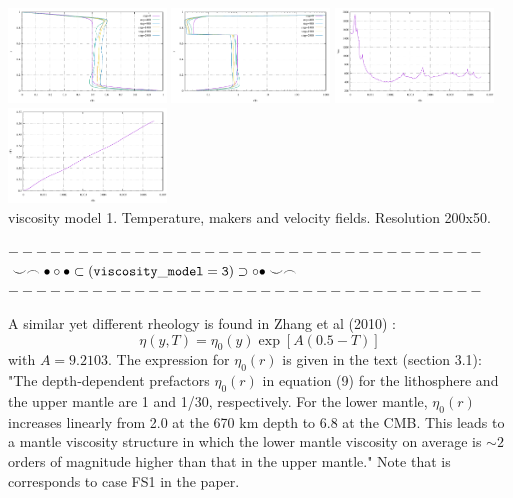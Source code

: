 \begin{center}
\includegraphics[width=4.2cm]{python_codes/fieldstone_88/results/model2/profile_T.pdf}
\includegraphics[width=4.2cm]{python_codes/fieldstone_88/results/model2/profile_eta.pdf}
\includegraphics[width=4.2cm]{python_codes/fieldstone_88/results/model2/vrms.pdf}
\includegraphics[width=4.2cm]{python_codes/fieldstone_88/results/model2/Tavrg.pdf}\\
{\captionfont viscosity model 1. Temperature, makers and velocity fields. Resolution 200x50.}
\end{center} 













\newpage
\begin{center}
$----------------------------------$\\
$\smile \frown \bullet \circ \bullet \subset ( {\tt viscosity\_model=3} ) \supset \circ \bullet \smile \frown$\\
$----------------------------------$
\end{center}


A similar yet different rheology is found in Zhang et al (2010) \cite{zhzl10}:
\[
\eta(y,T) = \eta_0(y) \exp [A(0.5-T)]
\]
with $A=9.2103$. The expression for $\eta_0(r)$ is given in the text (section 3.1):
"The depth‐dependent prefactors $\eta_0(r)$ in equation (9)
for the lithosphere and the upper mantle are 1 and 1/30,
respectively. For the lower mantle, $\eta_0(r)$ increases
linearly from 2.0 at the 670 km depth to 6.8 at the CMB. This
leads to a mantle viscosity structure in which the lower mantle
viscosity on average is $\sim 2$ orders of magnitude higher than
that in the upper mantle." Note that is corresponds to case FS1 in the paper. 

